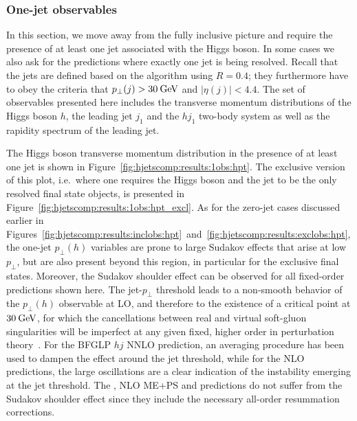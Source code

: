 \subsubsection{One-jet observables}
\label{sec:hjetscomp:results:1jobs}

In this section, we move away from the fully inclusive picture and
require the presence of at least one jet associated with the Higgs
boson. In some cases we also ask for the predictions where exactly one
jet is being resolved. Recall that the jets are defined based on the
\antikt algorithm using $R=0.4$; they furthermore have to obey the
criteria that $p_\perp(j)>30\text{\:GeV}$ and $|\eta(j)|<4.4$. The set of
observables presented here includes the transverse momentum
distributions of the Higgs boson $h$, the leading jet $j_1$ and the
$hj_1$ two-body system as well as the rapidity spectrum of the leading
jet.

The Higgs boson transverse momentum distribution in the presence of at
least one jet is shown in
Figure~\ref{fig:hjetscomp:results:1obs:hpt}. The exclusive version of
this plot, i.e.~where one requires the Higgs boson and the jet to be 
the only resolved final state objects,
is presented in Figure~\ref{fig:hjetscomp:results:1obs:hpt_excl}. As
for the zero-jet cases discussed earlier in
Figures~\ref{fig:hjetscomp:results:inclobs:hpt}~and~\ref{fig:hjetscomp:results:exclobs:hpt},
the one-jet $p_\perp(h)$ variables are prone to large Sudakov effects that arise at low $p_\perp$, 
but are also present beyond
this region, in particular for the exclusive final states. Moreover, the
Sudakov shoulder effect can be observed for all fixed-order
predictions shown here. The jet-$p_\perp$ threshold leads to a
non-smooth behavior of the $p_\perp(h)$ observable at LO, and
therefore to the existence of a critical point at $30\text{\:GeV}$, for which
the cancellations between real and virtual soft-gluon singularities
will be imperfect at any given fixed, higher order in perturbation
theory~\cite{Catani:1997xc}. For the BFGLP $hj$ NNLO  prediction, an
averaging procedure has been used to dampen the effect around the jet
threshold, while for the NLO predictions, the large oscillations are a
clear indication of the instability emerging at the jet threshold. The
\NNLOPS, NLO ME+PS and \Resbos predictions do not suffer from
the Sudakov shoulder effect since they include the necessary all-order
resummation corrections.


